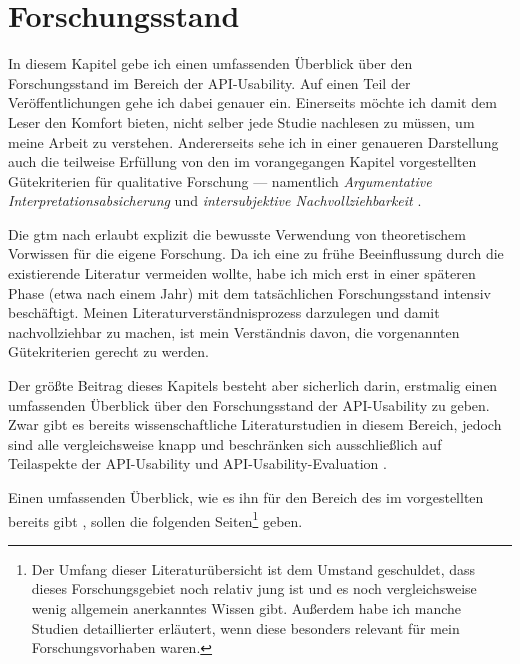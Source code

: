 \glsresetall
\chapter{Forschungsstand}
\label{sec:forschungsstand}

In diesem Kapitel gebe ich einen umfassenden Überblick über den Forschungsstand im Bereich der API-Usability.
Auf einen Teil der Veröffentlichungen gehe ich dabei genauer ein. Einerseits möchte ich damit dem Leser den Komfort bieten, nicht selber jede Studie nachlesen zu müssen, um meine Arbeit zu verstehen. Andererseits sehe ich in einer genaueren Darstellung auch die teilweise Erfüllung von den im vorangegangen Kapitel vorgestellten Gütekriterien für qualitative Forschung --- namentlich  \textit{Argumentative Interpretationsabsicherung} \citep{mayring2002einfhrung} und \textit{intersubjektive Nachvollziehbarkeit} \citep{gesis-solis-00272267}.

Die \gls{gtm} nach \cite{strauss1990basics} erlaubt explizit die bewusste Verwendung von theoretischem Vorwissen für die eigene Forschung. Da ich eine zu frühe Beeinflussung durch die existierende Literatur vermeiden wollte, habe ich mich erst in einer späteren Phase (etwa nach einem Jahr) mit dem tatsächlichen Forschungsstand intensiv beschäftigt. Meinen Literaturverständnisprozess darzulegen und damit nachvollziehbar zu machen, ist mein Verständnis davon, die vorgenannten Gütekriterien gerecht zu werden. 

Der größte Beitrag dieses Kapitels besteht aber sicherlich darin, erstmalig einen umfassenden Überblick über den Forschungsstand der API-Usability zu geben. Zwar gibt es bereits wissenschaftliche Literaturstudien in diesem Bereich, jedoch sind alle vergleichsweise knapp und beschränken sich ausschließlich auf Teilaspekte der API-Usability \citep{Zibran:2011fx,zibran2008makes} und API-Usability-Evaluation \citep{Barth:2011uh}.

Einen umfassenden Überblick, wie es ihn für den Bereich des im  vorgestellten  bereits gibt \citep{Ko:2011el}, sollen die folgenden  Seiten\footnote{Der Umfang dieser Literaturübersicht ist dem Umstand geschuldet, dass dieses Forschungsgebiet noch relativ jung ist und es noch vergleichsweise wenig allgemein anerkanntes Wissen gibt. Außerdem habe ich manche Studien detaillierter erläutert, wenn diese besonders relevant für mein Forschungsvorhaben waren.} geben.

